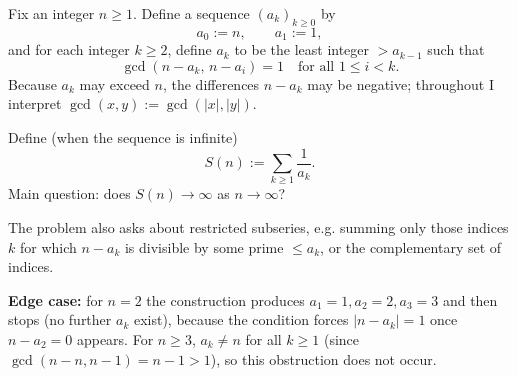 Fix an integer $n\ge 1$. Define a sequence $(a_k)_{k\ge 0}$ by
\[a_0:=n,\qquad a_1:=1,\]
and for each integer $k\ge 2$, define $a_k$ to be the least integer $>a_{k-1}$ such that
\[\gcd(n-a_k,\,n-a_i)=1\quad\text{for all }1\le i<k.
\]
Because $a_k$ may exceed $n$, the differences $n-a_k$ may be negative; throughout I interpret $\gcd(x,y):=\gcd(|x|,|y|)$.

Define (when the sequence is infinite)
\[S(n):=\sum_{k\ge 1} \frac1{a_k}.
\]
Main question: does $S(n)\to\infty$ as $n\to\infty$?

The problem also asks about restricted subseries, e.g. summing only those indices $k$ for which $n-a_k$ is divisible by some prime $\le a_k$, or the complementary set of indices.

\textbf{Edge case:} for $n=2$ the construction produces $a_1=1,a_2=2,a_3=3$ and then stops (no further $a_k$ exist), because the condition forces $|n-a_k|=1$ once $n-a_2=0$ appears. For $n\ge 3$, $a_k\neq n$ for all $k\ge 1$ (since $\gcd(n-n,n-1)=n-1>1$), so this obstruction does not occur.
